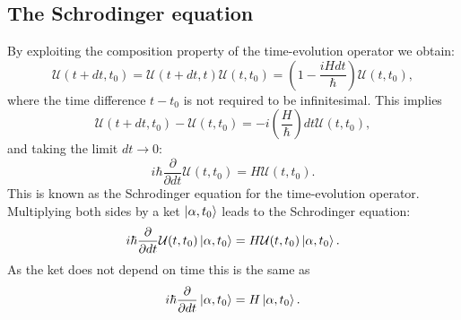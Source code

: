 \subsection{The Schrodinger equation}
By exploiting the composition property of the time-evolution
operator we obtain:
$$ \mathcal{U}(t + dt, t_0) = \mathcal{U}(t + dt, t)
    \mathcal{U}(t, t_0) = (1 - \frac{i H dt}{\hbar})
    \mathcal{U}(t, t_0) ,$$
where the time difference $t - t_0$ is not required to be infinitesimal.
This implies
$$ \mathcal{U}(t + dt, t_0) - \mathcal{U}(t, t_0) = 
    -i(\frac{H}{\hbar}) dt \mathcal{U}(t, t_0) ,$$
and taking the limit $dt \rightarrow 0$:
$$ i \hbar \frac{\partial}{\partial dt} \mathcal{U}(t, t_0)
    = H \mathcal{U}(t, t_0) .$$
This is known as the Schrodinger equation for the time-evolution operator.
Multiplying both sides by a ket $\ket{\alpha, t_0}$ leads to the
Schrodinger equation:
$$ i \hbar \frac{\partial}{\partial dt} \mathcal{U}(t, t_0)
    \ket{\alpha, t_0} = H \mathcal{U}(t, t_0) \ket{\alpha, t_0} .$$
As the ket does not depend on time this is the same as
$$ i \hbar \frac{\partial}{\partial dt}
    \ket{\alpha, t_0} = H \ket{\alpha, t_0} .$$
